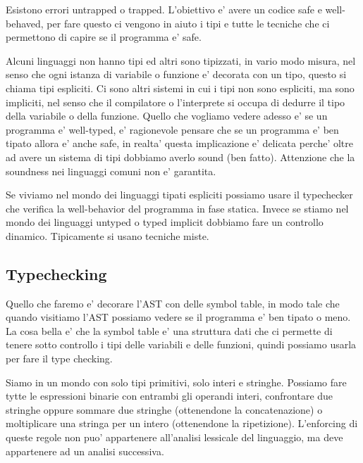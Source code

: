 Esistono errori untrapped o trapped. L'obiettivo e' avere un codice safe e well-behaved, per fare questo ci vengono in aiuto i tipi e tutte le tecniche che ci permettono di capire se il programma e' safe.

Alcuni linguaggi non hanno tipi ed altri sono tipizzati, in vario modo misura, nel senso che ogni istanza di variabile o funzione e' decorata con un tipo, questo si chiama tipi espliciti. Ci sono altri sistemi in cui i tipi non sono espliciti, ma sono impliciti, nel senso che il compilatore o l'interprete si occupa di dedurre il tipo della variabile o della funzione.
Quello che vogliamo vedere adesso e' se un programma e' well-typed, e' ragionevole pensare che se un programma e' ben tipato allora e' anche safe, in realta' questa implicazione e' delicata perche' oltre ad avere un sistema di tipi dobbiamo averlo sound (ben fatto). Attenzione che la soundness nei linguaggi comuni non e' garantita.

Se viviamo nel mondo dei linguaggi tipati espliciti possiamo usare il typechecker che verifica la well-behavior del programma in fase statica. Invece se stiamo nel mondo dei linguaggi untyped o typed implicit dobbiamo fare un controllo dinamico. Tipicamente si usano tecniche miste.

\subsection{Typechecking}

Quello che faremo e' decorare l'AST con delle symbol table, in modo tale che quando visitiamo l'AST possiamo vedere se il programma e' ben tipato o meno. La cosa bella e' che la symbol table e' una struttura dati che ci permette di tenere sotto controllo i tipi delle variabili e delle funzioni, quindi possiamo usarla per fare il type checking.

Siamo in un mondo con solo tipi primitivi, solo interi e stringhe. Possiamo fare tytte le espressioni binarie con entrambi gli operandi interi, confrontare due stringhe oppure sommare due stringhe (ottenendone la concatenazione) o moltiplicare una stringa per un intero (ottenendone la ripetizione). L'enforcing di queste regole non puo' appartenere all'analisi lessicale del linguaggio, ma deve appartenere ad un analisi successiva.